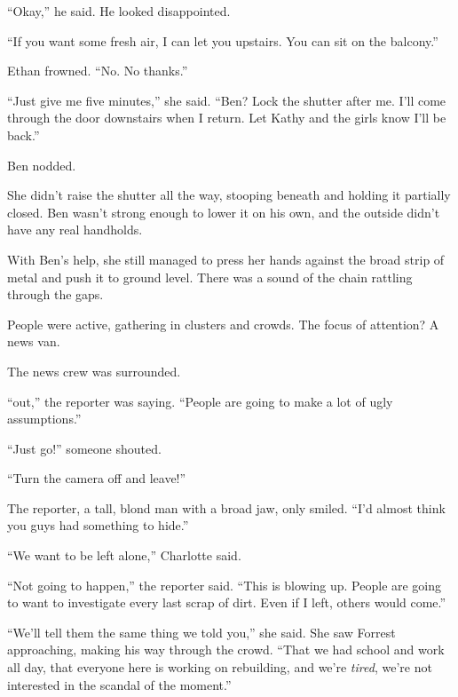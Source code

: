 ``Okay,'' he said.  He looked disappointed.



``If you want some fresh air, I can let you upstairs.  You can sit on the balcony.''



Ethan frowned.  ``No.  No thanks.''



``Just give me five minutes,'' she said.  ``Ben?  Lock the shutter after me.  I'll come through the door downstairs when I return.  Let Kathy and the girls know I'll be back.''



Ben nodded.



She didn't raise the shutter all the way, stooping beneath and holding it partially closed.  Ben wasn't strong enough to lower it on his own, and the outside didn't have any real handholds.



With Ben's help, she still managed to press her hands against the broad strip of metal and push it to ground level.  There was a sound of the chain rattling through the gaps.



People were active, gathering in clusters and crowds.  The focus of attention?  A news van.



The news crew was surrounded.



``\ldotsword out,'' the reporter was saying.  ``People are going to make a lot of ugly assumptions.''



``Just go!'' someone shouted.



``Turn the camera off and leave!''



The reporter, a tall, blond man with a broad jaw, only smiled.  ``I'd almost think you guys had something to hide.''



``We want to be left alone,'' Charlotte said.



``Not going to happen,'' the reporter said.  ``This is blowing up.  People are going to want to investigate every last scrap of dirt.  Even if I left, others would come.''



``We'll tell them the same thing we told you,'' she said.  She saw Forrest approaching, making his way through the crowd.  ``That we had school and work all day, that everyone here is working on rebuilding, and we're \emph{tired}, we're not interested in the scandal of the moment.''



